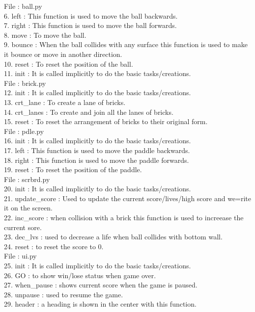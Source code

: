 \documentclass{article}
\begin{document}
File : ball.py\\
6. left : This function is used to move the ball backwards.\\
7. right : This function is used to move the ball forwards.\\
8. move : To move the ball.\\
9. bounce : When the ball collides with any surface this function is used to make it bounce or move in another direction.\\
10. reset : To reset the position of the ball.\\
11. init : It is called implicitly to do the basic tasks/creations.\\

File : brick.py\\
12. init : It is called implicitly to do the basic tasks/creations.\\
13. crt\_lane : To create a lane of bricks.\\
14. crt\_lanes : To create and join all the lanes of bricks.\\
15. reset : To reset the arrangement of bricks to their original form.\\

File : pdle.py\\
16. init : It is called implicitly to do the basic tasks/creations.\\
17. left : This function is used to move the paddle backwards.\\
18. right : This function is used to move the paddle forwards.\\
19. reset : To reset the position of the paddle.\\

File : scrbrd.py\\
20. init : It is called implicitly to do the basic tasks/creations.\\
21. update\_score : Used to update the current score/lives/high score and we=rite it on the screen.\\
22. inc\_score : when collision with a brick this function is used to increease the current sore.\\
23. dec\_lvs : used to decrease a life when ball collides with bottom wall.\\
24. reset : to reset the score to 0.\\
 
File : ui.py\\
25. init : It is called implicitly to do the basic tasks/creations.\\
26. GO : to show win/lose status when game over.\\
27. when\_pause : shows current score when the game is paused.\\
28. unpause : used to resume the game.\\
29. header : a heading is shown in the center with this function.\\
\end{document}
